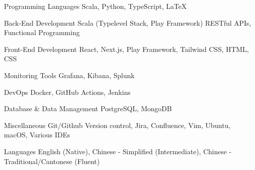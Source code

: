 
\begin{sloppypar} %
\small %
\begin{cvskills}

  \cvskill
  {Programming Languages} 
  {Scala, Python, TypeScript, LaTeX}

  \cvskill
  {Back-End Development} 
  {Scala (Typelevel Stack, Play Framework) RESTful APIs, Functional Programming} 

  \cvskill
  {Front-End Development} 
  {React, Next.js, Play Framework, Tailwind CSS, HTML, CSS}

\cvskill
  {Monitoring Tools} 
  {Grafana, Kibana, Splunk} 

  \cvskill
  {DevOps} 
  {Docker, GitHub Actions, Jenkins}

  \cvskill
  {Database \& Data Management} 
  {PostgreSQL, MongoDB}

\cvskill
  {Miscellaneous} 
  {Git/Github Version control, Jira, Confluence, Vim, Ubuntu, macOS, Various IDEs} 

  \cvskill
  {Languages} 
  {English (Native), Chinese - Simplified (Intermediate), Chinese - Traditional/Cantonese (Fluent)}

\end{cvskills}
\normalsize
\end{sloppypar}
